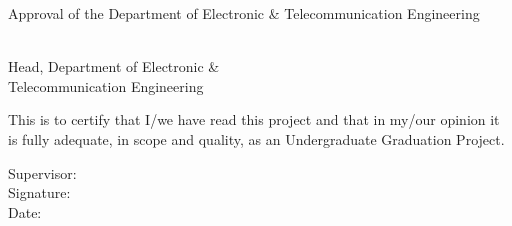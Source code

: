 \begin{flushleft}
\large{
	Approval of the Department of Electronic \& Telecommunication Engineering \\
}
	
  \vspace{30mm}

  \normalsize
\begin{multicols}{2}
	\vfill\null
	\columnbreak
	\begin{center}

		{\makebox[7cm]{\dotfill}} \\ 
		Head, Department of Electronic \& \\
		Telecommunication Engineering
 \\
	\end{center}
\end{multicols}


  \vspace{20mm}

This is to certify that I/we have read this project and that in my/our opinion it is fully adequate, in scope and quality, as an Undergraduate Graduation Project. \\

  \vspace{10mm}
  
  Supervisor: \guideA \\
    \vspace{15mm}
  Signature:  {\makebox[7cm]{\dotfill}}
\\
    \vspace{10mm}
  Date: {\makebox[7.9cm]{\dotfill}}
\\

\end{flushleft}
